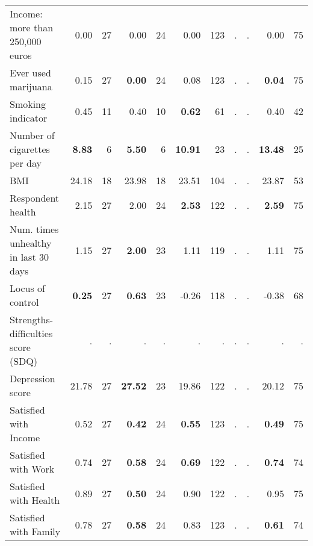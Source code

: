 \begin{tabular}{l r r r r r r r r r r}
Income: more than 250,000 euros &      0.00 &        27 &      0.00 &        24 &      0.00 &       123 &         . & . &      0.00 &        75 \\
Ever used marijuana &      0.15 &        27 & \textbf{     0.00} &        24 &      0.08 &       123 &         . & . & \textbf{     0.04} &        75 \\
Smoking indicator &      0.45 &        11 &      0.40 &        10 & \textbf{     0.62} &        61 &         . & . &      0.40 &        42 \\
Number of cigarettes per day & \textbf{     8.83} &         6 & \textbf{     5.50} &         6 & \textbf{    10.91} &        23 &         . & . & \textbf{    13.48} &        25 \\
BMI &     24.18 &        18 &     23.98 &        18 &     23.51 &       104 &         . & . &     23.87 &        53 \\
Respondent health &      2.15 &        27 &      2.00 &        24 & \textbf{     2.53} &       122 &         . & . & \textbf{     2.59} &        75 \\
Num. times unhealthy in last 30 days &      1.15 &        27 & \textbf{     2.00} &        23 &      1.11 &       119 &         . & . &      1.11 &        75 \\
Locus of control & \textbf{     0.25} &        27 & \textbf{     0.63} &        23 &     -0.26 &       118 &         . & . &     -0.38 &        68 \\
Strengths-difficulties score (SDQ) &         . & . &         . & . &         . & . &         . & . &         . & . \\
Depression score &     21.78 &        27 & \textbf{    27.52} &        23 &     19.86 &       122 &         . & . &     20.12 &        75 \\
Satisfied with Income &      0.52 &        27 & \textbf{     0.42} &        24 & \textbf{     0.55} &       123 &         . & . & \textbf{     0.49} &        75 \\
Satisfied with Work &      0.74 &        27 & \textbf{     0.58} &        24 & \textbf{     0.69} &       122 &         . & . & \textbf{     0.74} &        74 \\
Satisfied with Health &      0.89 &        27 & \textbf{     0.50} &        24 &      0.90 &       122 &         . & . &      0.95 &        75 \\
Satisfied with Family &      0.78 &        27 & \textbf{     0.58} &        24 &      0.83 &       123 &         . & . & \textbf{     0.61} &        74 \\
\bottomrule
\end{tabular}
